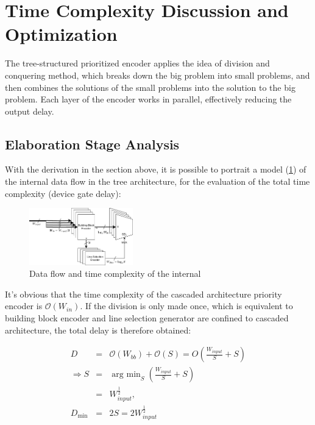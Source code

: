 \documentclass[journal, onecolumn]{IEEEtran}
\begin{document}
\section{Time Complexity Discussion and Optimization}

The tree-structured prioritized encoder applies the idea of division and conquering method, which breaks down the big problem into small problems, and then combines the solutions of the small problems into the solution to the big problem. Each layer of the encoder works in parallel, effectively reducing the output delay.

\subsection{Elaboration Stage Analysis}

With the derivation in the section above, it is possible to portrait a model (\ref{data_model}) of the internal data flow in the tree architecture, for the evaluation of the total time complexity (device gate delay):

\begin{figure}[htpb]
  \begin{center}
    \includegraphics[width=0.40\textwidth]{report_lab3.assets/data_model_crop.pdf}
    \caption{Data flow and time complexity of the internal}
    \label{data_model}
  \end{center}
\end{figure}

It's obvious that the time complexity of the cascaded architecture priority encoder is \(\mathcal{O}(W_{in})\). If the division is only made once, which is equivalent to building block encoder and line selection generator are confined to cascaded architecture, the total delay is therefore obtained:

\begin{eqnarray}
  D&=&\mathcal{O}(W_{bb})+\mathcal{O}(S)=O\left(\frac{W_{input}}{S}+S\right) \\
  \Rightarrow S &=& \mathop{\mathrm{arg}\ \min}_{S}\left(\frac{W_{input}}{S}+S\right)\\
  &=& W_{input}^{\frac{1}{2}}, \\
  D_{\min} &=& 2S = 2W_{input}^{\frac{1}{2}}
\end{eqnarray}
\end{document}
